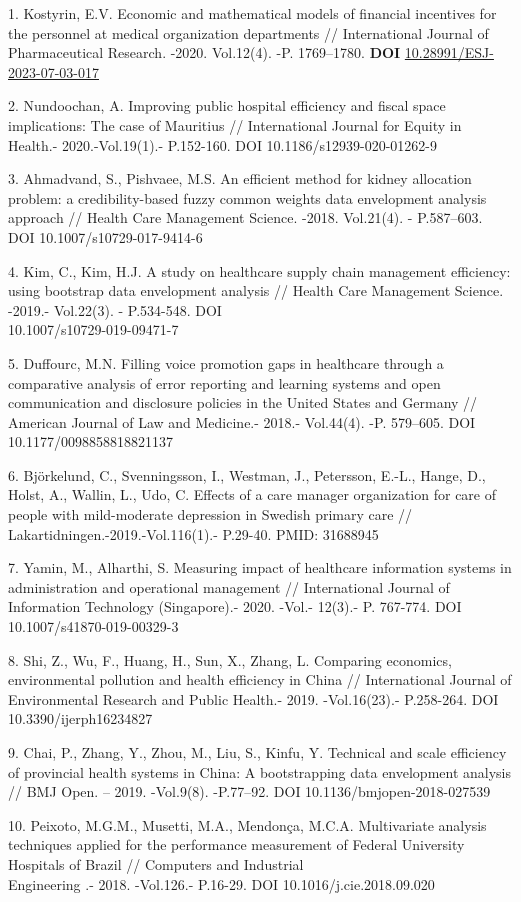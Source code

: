\begin{references}
1. Kostyrin, E.V. Economic and mathematical models of financial
incentives for the personnel at medical organization departments //
International Journal of Pharmaceutical Research. -2020. Vol.12(4). -P.
1769--1780. {\bfseries DOI}
\href{https://doi.org/10.28991/ESJ-2023-07-03-017}{10.28991/ESJ-2023-07-03-017}

2. Nundoochan, A. Improving public hospital efficiency and fiscal space
implications: The case of Mauritius // International Journal for Equity
in Health.- 2020.-Vol.19(1).- P.152-160. DOI 10.1186/s12939-020-01262-9

3. Ahmadvand, S., Pishvaee, M.S. An efficient method for kidney
allocation problem: a credibility-based fuzzy common weights data
envelopment analysis approach // Health Care Management Science. -2018.
Vol.21(4). - P.587--603. DOI 10.1007/s10729-017-9414-6

4. Kim, C., Kim, H.J. A study on healthcare supply chain management
efficiency: using bootstrap data envelopment analysis // Health Care
Management Science. -2019.- Vol.22(3). - P.534-548. DOI\\
10.1007/s10729-019-09471-7

5. Duffourc, M.N. Filling voice promotion gaps in healthcare through a
comparative analysis of error reporting and learning systems and open
communication and disclosure policies in the United States and Germany
// American Journal of Law and Medicine.- 2018.- Vol.44(4). -P.
579--605. DOI \\10.1177/0098858818821137

6. Björkelund, C., Svenningsson, I., Westman, J., Petersson, E.-L.,
Hange, D., Holst, A., Wallin, L., Udo, C. Effects of a care manager
organization for care of people with mild-moderate depression in Swedish
primary care // Lakartidningen.-2019.-Vol.116(1).- P.29-40. PMID:
31688945

7. Yamin, M., Alharthi, S. Measuring impact of healthcare information
systems in administration and operational management // International
Journal of Information Technology (Singapore).- 2020. -Vol.- 12(3).- P.
767-774. DOI 10.1007/s41870-019-00329-3

8. Shi, Z., Wu, F., Huang, H., Sun, X., Zhang, L. Comparing economics,
environmental pollution and health efficiency in China // International
Journal of Environmental Research and Public Health.- 2019.
-Vol.16(23).- P.258-264. DOI 10.3390/ijerph16234827

9. Chai, P., Zhang, Y., Zhou, M., Liu, S., Kinfu, Y. Technical and scale
efficiency of provincial health systems in China: A bootstrapping data
envelopment analysis // BMJ Open. -- 2019. -Vol.9(8). -P.77--92. DOI
10.1136/bmjopen-2018-027539

10. Peixoto, M.G.M., Musetti, M.A., Mendonça, M.C.A. Multivariate
analysis techniques applied for the performance measurement of Federal
University Hospitals of Brazil // Computers and Industrial \\Engineering .-
2018. -Vol.126.- P.16-29. DOI 10.1016/j.cie.2018.09.020
\end{references}

